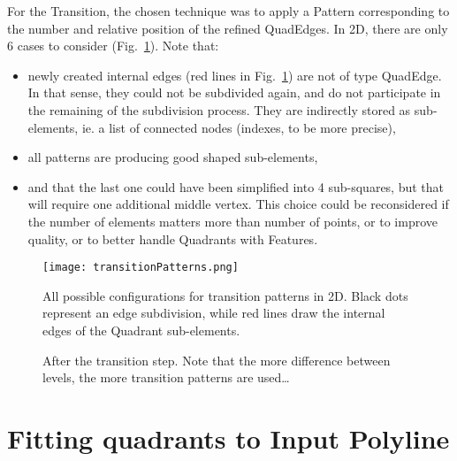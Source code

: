 \documentclass[10pt]{article}
\begin{document}
For the Transition, the chosen technique was to apply a Pattern corresponding to the  number and relative position of the refined QuadEdges. In 2D, there are only 6 cases to consider (Fig.~\ref{fig:transitionpatterns}). Note that:
\begin{itemize}
\item newly created internal edges (red lines in Fig.~\ref{fig:transitionpatterns}) are not of type QuadEdge. In that sense, they could not be subdivided again, and do not participate in the remaining of the subdivision process. They are indirectly stored as sub-elements, ie. a list of connected nodes (indexes, to be more precise),
\item all patterns are producing good shaped sub-elements,
\item and that the last one could have been simplified into 4 sub-squares, but that will require one additional middle vertex. This choice could be reconsidered if the number of elements matters more than number of points, or to improve quality, or to better handle Quadrants with Features.
\end{itemize}
%
\begin{figure}[htb]
\centering
  \texttt{[image: transitionPatterns.png]}
 \caption{All possible configurations for transition patterns in 2D. Black dots represent an edge subdivision, while red lines draw the internal edges of the Quadrant sub-elements.}
\label{fig:transitionpatterns}
\end{figure}
%
\begin{figure}[htb]
\centering
\centering
\centering
\centering
 \caption{After the transition step. Note that the more difference between levels, the more transition patterns are used\ldots}
\label{fig:pietranss}
\end{figure}

\section{Fitting quadrants to Input Polyline}
\label{sec:method}
\end{document}
